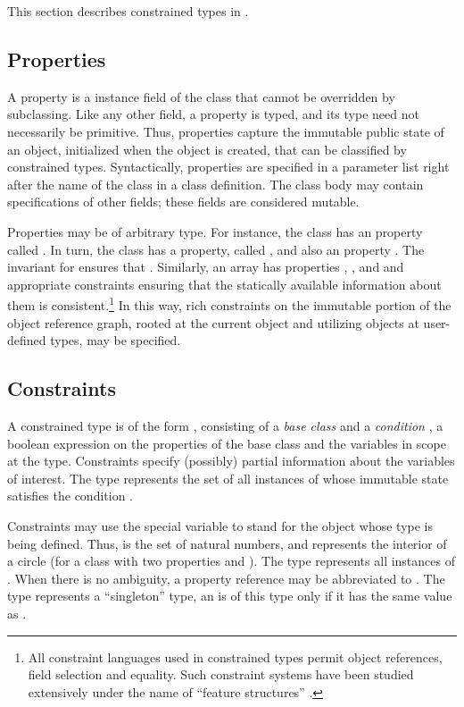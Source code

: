 This section describes constrained types in \Xten{}.

\subsection{Properties}

A property is a   instance field of the
class that cannot be overridden by subclassing. Like any other field,
a property is typed, and its type need not necessarily be
primitive. Thus, properties capture the immutable public state of an
object, initialized when the object is created, that can be
classified by constrained types. Syntactically, properties are
specified in a parameter list right after the name of the class in a
class definition. The class body may contain specifications of other
fields; these fields are considered mutable.

Properties may be of arbitrary type. For instance, the class
 has an  property called . In turn, the
class  has a  property, called , and
also an  property .  The invariant for 
ensures that . Similarly, an array has
properties , , and 
and appropriate constraints ensuring that the statically available
information about them is consistent.\footnote{All constraint
languages used in constrained types permit object references, field
selection and equality. Such constraint systems have been studied
extensively under the name of ``feature structures''
\cite{feature-structures}.}
%
In this way, rich  
constraints on the immutable portion of
the object reference graph, rooted at the current object and utilizing
objects at user-defined types, may be specified.

\subsection{Constraints}
A constrained type is of the form , consisting of a
{\em base class}  and a {\em condition} , a
boolean expression on the properties of the base class and the
 variables in scope at the type.  Constraints specify
(possibly) partial information about the variables of interest.
The type  represents the set of all
instances of  whose immutable state satisfies the
condition .

Constraints may use the special variable  to stand for
the object whose type is being defined. Thus,  is
the set of natural numbers, and 
represents the interior of a circle (for a class  with two
 properties  and ). The type  represents all instances of . When there is no
ambiguity, a property reference  may be abbreviated
to . The type  represents a ``singleton'' type, an
 is of this type only if it has the same value as .

